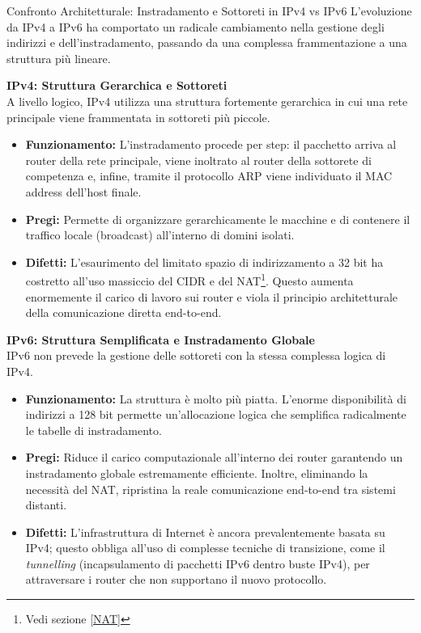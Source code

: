 \documentclass[a4paper,12pt]{report}
\begin{document}
\begin{notebox}{Confronto Architetturale: Instradamento e Sottoreti in IPv4 vs IPv6}
L'evoluzione da IPv4 a IPv6 ha comportato un radicale cambiamento nella gestione degli indirizzi e dell'instradamento, passando da una complessa frammentazione a una struttura più lineare.

\textbf{IPv4: Struttura Gerarchica e Sottoreti} \\
A livello logico, IPv4 utilizza una struttura fortemente gerarchica in cui una rete principale viene frammentata in sottoreti più piccole.
\begin{itemize}
    \item \textbf{Funzionamento:} L'instradamento procede per step: il pacchetto arriva al router della rete principale, viene inoltrato al router della sottorete di competenza e, infine, tramite il protocollo ARP viene individuato il MAC address dell'host finale.
    \item \textbf{Pregi:} Permette di organizzare gerarchicamente le macchine e di contenere il traffico locale (broadcast) all'interno di domini isolati.
    \item \textbf{Difetti:} L'esaurimento del limitato spazio di indirizzamento a 32 bit  ha costretto all'uso massiccio del CIDR  e del NAT\footnote{Vedi sezione \ref{NAT}}. Questo aumenta enormemente il carico di lavoro sui router e viola il principio architetturale della comunicazione diretta end-to-end.
\end{itemize}

\vspace{0.5cm}
\textbf{IPv6: Struttura Semplificata e Instradamento Globale} \\
IPv6 non prevede la gestione delle sottoreti con la stessa complessa logica di IPv4.
\begin{itemize}
    \item \textbf{Funzionamento:} La struttura è molto più piatta. L'enorme disponibilità di indirizzi a 128 bit  permette un'allocazione logica che semplifica radicalmente le tabelle di instradamento.
    \item \textbf{Pregi:} Riduce il carico computazionale all'interno dei router garantendo un instradamento globale estremamente efficiente. Inoltre, eliminando la necessità del NAT, ripristina la reale comunicazione end-to-end tra sistemi distanti.
    \item \textbf{Difetti:} L'infrastruttura di Internet è ancora prevalentemente basata su IPv4; questo obbliga all'uso di complesse tecniche di transizione, come il \textit{tunnelling} (incapsulamento di pacchetti IPv6 dentro buste IPv4), per attraversare i router che non supportano il nuovo protocollo.
\end{itemize}
\end{notebox}
\end{document}
